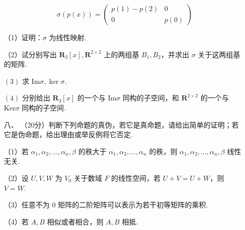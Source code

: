 \begin{enumerate}
	\[\sigma(p(x))=\begin{pmatrix}
	    p(1)-p(2)&0\\
	    0 & p(0)\end{pmatrix}\]

	（1）证明：$\sigma$ 为线性映射.

	（2）试分别写出 $\mathbf R_3[x],\mathbf R^{2\times 2}$ 上的两组基 $B_1,B_2$，并求出 $\sigma$ 关于这两组基的矩阵.

	$(3)$ 求 $\text{Im}\sigma,\ker\sigma$.

	$(4)$ 分别给出 $\mathbf R_3[x]$ 的一个与 $\text{Im}\sigma$ 同构的子空间，和 $\mathbf R^{2\times 2}$ 的一个与 $\text{Ker}\sigma$ 同构的子空间.
	\item[八、] （20分）判断下列命题的真伪，若它是真命题，请给出简单的证明；若它是伪命题，给出理由或举反例将它否定.

	（1）若 $\alpha_1,\alpha_2,\dots,\alpha_n,\beta$ 的秩大于 $\alpha_1,\alpha_2,\dots,\alpha_n$ 的秩，则 $\alpha_1,\alpha_2,\dots,\alpha_n,\beta$ 线性无关.

	（2）设 $U,V,W$ 为 $V_0$ 关于数域 $F$ 的线性空间，若 $U+V=U+W$，则 $V=W$.

	（3）任意不为 $0$ 矩阵的二阶矩阵可以表示为若干初等矩阵的乘积.

	（4）若 $A,B$ 相似或者相合，则 $A,B$ 相抵.
\end{enumerate}
\newpage
